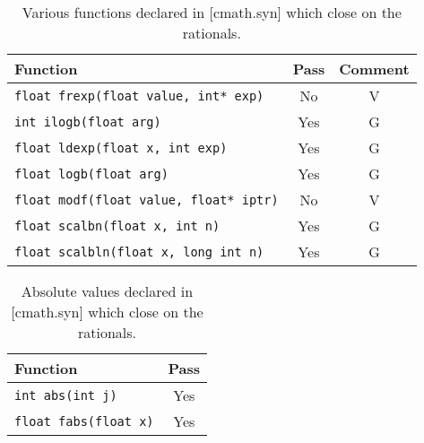\documentclass[prd,twocolumn,amsmath,amssymb,nofootinbib,eqsecnum]{revtex4-1}
\newcommand{\code}[1]{{\tt #1}}
\begin{document}
\begin{table}[h]
	\begin{tabular}{lcc}
		Function & Pass & Comment
	\\
	\hline \hline
		\code{float frexp(float value, int* exp)} & No & V
	\\
	\hline
		\code{int ilogb(float arg)} & Yes & G
	\\
	\hline
		\code{float ldexp(float x, int exp)} & Yes & G		
	\\
	\hline
		\code{float logb(float arg)} & Yes & G
	\\
	\hline
		\code{float modf(float value, float* iptr)} & No & V
	\\
	\hline
		\code {float scalbn(float x, int n)} & Yes & G
	\\
	\hline
		\code {float scalbln(float x, long int n)} & Yes & G
	\end{tabular}
\caption{Various functions declared in [cmath.syn] which close on the rationals.}
\label{tab:26.9.1}
\end{table}


\begin{table}[h]
	\begin{tabular}{lc}
		Function & Pass
	\\
	\hline \hline
		\code{int abs(int j)} & Yes
	\\
	\hline
		\code{float fabs(float x)} & Yes
	\end{tabular}
\caption{Absolute values declared in [cmath.syn]  which close on the rationals.}
\label{tab:26.9.2}
\end{table}
\end{document}
